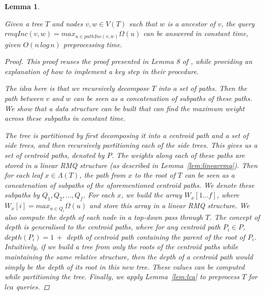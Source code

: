 \documentclass{article}
\newcommand{\leafset}{\Lambda}
\newtheorem{rmqinc}[incompatibility]{Lemma}
\begin{document}
    \begin{rmqinc}
        \label{lem:rmqinc}

        Given a tree $T$ and nodes $v, w \in V(T)$ such that $w$ is a ancestor of $v$, the query $rmqInc(v, w) = max_{u \in pathInc(v, w)}\Omega(u)$ can be answered in constant time, given $O(n\,log\,n)$ preprocessing time.

        \begin{proof}
            This proof reuses the proof presented in Lemma 8 of \cite{jansson2018algorithms}, while providing an explanation of how to implement a key step in their procedure.

            The idea here is that we recursively decompose $T$ into a set of paths. Then the path between $v$ and $w$ can be seen as a concatenation of subpaths of these paths. We show that a data structure can be built that can find the maximum weight across these subpaths in constant time.

            The tree is partitioned by first decomposing it into a centroid path and a set of side trees, and then recursively partitioning each of the side trees. This gives us a set of centroid paths, denoted by $P$. The weights along each of these paths are stored in a linear RMQ structure (as described in Lemma~\ref{lem:linearrmq}). Then for each leaf $x \in \leafset(T)$, the path from $x$ to the root of $T$ can be seen as a concatenation of subpaths of the aforementioned centroid paths. We denote these subpaths by $Q_1, Q_2, ..., Q_f$. For each $x$, we build the array $W_x[1 ... f]$, where $W_x[i] = max_{u \in Q_i}\Omega(u)$ and store this array in a linear RMQ structure. We also compute the depth of each node in a top-down pass through $T$. The concept of depth is generalised to the centroid paths, where for any centroid path $P_i \in P$, $depth(P_i) = 1\, +$ depth of centroid path containing the parent of the root of $P_i$. Intuitively, if we build a tree from only the roots of the centroid paths while maintaining the same relative structure, then the depth of a centroid path would simply be the depth of its root in this new tree. These values can be computed while partitioning the tree. Finally, we apply Lemma~\ref{lem:lca} to preprocess $T$ for $lca$ queries.


\end{proof}
\end{rmqinc}
\end{document}
